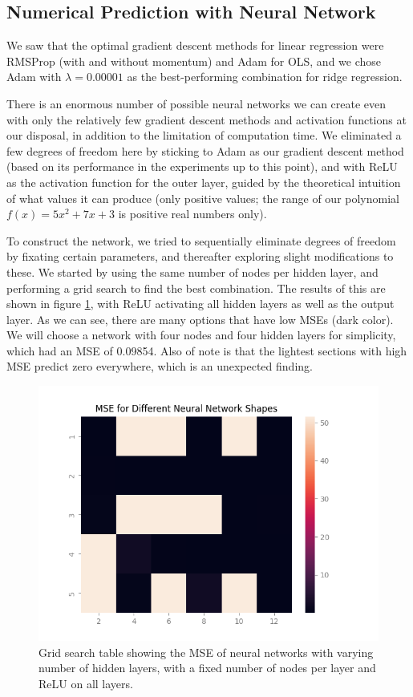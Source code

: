 \subsection{Numerical Prediction with Neural Network}
We saw that the optimal gradient descent methods for linear regression were RMSProp (with and without momentum) and Adam for OLS, and we chose Adam with $\lambda = 0.00001$ as the best-performing combination for ridge regression. 

There is an enormous number of possible neural networks we can create even with only the relatively few gradient descent methods and activation functions at our disposal, in addition to the limitation of computation time. We eliminated a few degrees of freedom here by sticking to Adam as our gradient descent method (based on its performance in the experiments up to this point), and with ReLU as the activation function for the outer layer, guided by the theoretical intuition of what values it can produce (only positive values; the range of our polynomial $f(x) = 5x^2 + 7x + 3$ is positive real numbers only).

To construct the network, we tried to sequentially eliminate degrees of freedom by fixating certain parameters, and thereafter exploring slight modifications to these. We started by using the same number of nodes per hidden layer, and performing a grid search to find the best combination. The results of this are shown in figure \ref{fig:gridsearch_numpred_layers_nodes}, with ReLU activating all hidden layers as well as the output layer. As we can see, there are many options that have low MSEs (dark color). We will choose a network with four nodes and four hidden layers for simplicity, which had an MSE of 0.09854. Also of note is that the lightest sections with high MSE predict zero everywhere, which is an unexpected finding.  
\begin{figure}
    \centering
    \includegraphics[width=\linewidth]{figures/all_plots/gridsearch_numpred_layers_nodes.png}
    \caption{Grid search table showing the MSE of neural networks with varying number of hidden layers, with a fixed number of nodes per layer and ReLU on all layers.}
    \label{fig:gridsearch_numpred_layers_nodes}
\end{figure}

